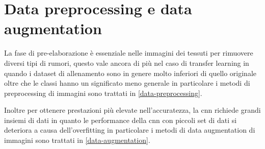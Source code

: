 \section{Data preprocessing e data augmentation}\label{data-pre-processing-e-augmentation-processing}

La fase di pre-elaborazione è essenziale nelle immagini dei tessuti per rimuovere diversi tipi di rumori, questo vale ancora di più nel caso di transfer learning in quando i dataset di allenamento sono in genere molto inferiori di quello originale oltre che le classi hanno un significato meno generale\cite{joel_tl} in particolare i metodi di preprocessing di immagini sono trattati in \cref{data-preprocessing}.

Inoltre per ottenere prestazioni più elevate nell'accuratezza, la \gls{cnn} richiede grandi insiemi di dati in quanto le performance della \gls{cnn} con piccoli set di dati si deteriora  a causa dell'\gls{overfitting}\cite{joel_tl} in particolare i metodi di data augmentation di immagini sono trattati in \cref{data-augmentation}.





